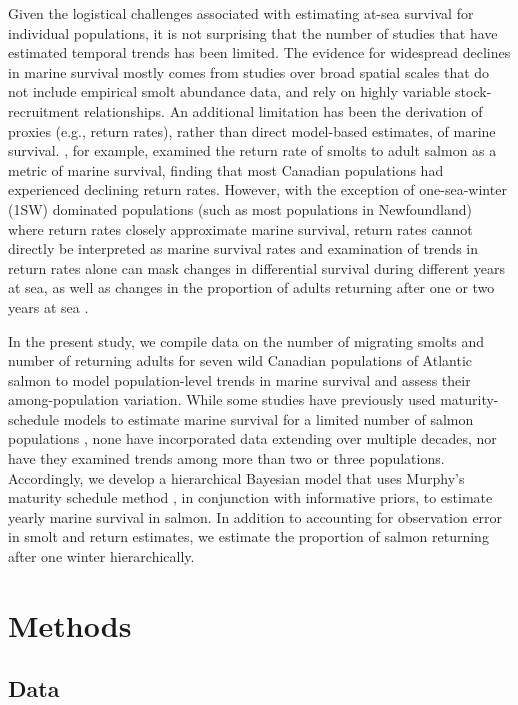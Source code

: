 \documentclass[12pt]{article}
\begin{document}

Given the logistical challenges associated with estimating at-sea survival for
individual populations, it is not surprising that the number of studies that
have estimated temporal trends has been limited. 
The evidence for widespread declines in marine survival mostly comes from studies
over broad spatial scales that do not include empirical smolt abundance data, and
rely on highly variable stock-recruitment relationships.
An additional limitation has been the derivation of
proxies (e.g., return rates), rather than direct model-based estimates, of
marine survival.
\citet{Chaput2012a}, for example, examined the return rate of smolts to adult salmon 
as a metric of marine survival, finding that most Canadian populations 
had experienced declining return rates. 
However, with the exception of one-sea-winter (1SW) dominated populations 
(such as most populations in Newfoundland) where return rates 
closely approximate marine survival, return rates cannot directly be interpreted as marine survival rates and 
examination of trends in return rates alone can mask changes in
differential survival during different years at sea, as well as changes in the
proportion of adults returning after one or two years at sea \citep{Hubley2011}.

In the present study, we compile data on the number of migrating smolts and number of returning adults 
for seven wild Canadian populations of Atlantic salmon to model population-level trends in marine survival
and assess their among-population variation.
While some studies have previously used maturity-schedule models to estimate marine
survival for a limited number of salmon populations \citep{Chaput2003b,Hubley2011}, none
have incorporated data extending over multiple decades, nor have they examined
trends among more than two or three populations. 
Accordingly, we develop a hierarchical Bayesian model that uses Murphy's maturity
schedule method \citep{Murphy1952}, in conjunction with informative priors, to estimate yearly
marine survival in salmon. In addition to accounting for observation error in
smolt and return estimates, we estimate the proportion of salmon returning
after one winter hierarchically.

\section*{Methods}

\subsection*{Data}
\end{document}

